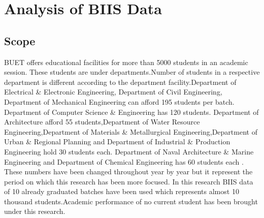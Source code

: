 
\chapter{Analysis of BIIS Data} %

\label{Analysis of BIIS Data} %



\section{Scope}
BUET offers educational facilities for more than 5000 students in an academic session.
These students are under  departments.Number of students in a respective department is different according to the department facility.Department of Electrical \& Electronic Engineering, Department of Civil Engineering, Department of Mechanical Engineering can afford 195 students per batch. Department of Computer Science \& Engineering has 120 students. Department of Architecture afford 55 students,Department of Water Resource Engineering,Department of Materials \& Metallurgical Engineering,Department of Urban \& Regional Planning and Department of Industrial \& Production Engineering hold 30 students each. Department of Naval Architecture \& Marine Engineering and Department of Chemical Engineering has 60 students each \cite{buet}. These numbers have been changed throughout year by year but 
it represent the period on which this research has been more focused.
In this research BIIS data of 10 already graduated batches have been used which represents almost 10 thousand students.Academic performance of no current student has been brought under this research. 



